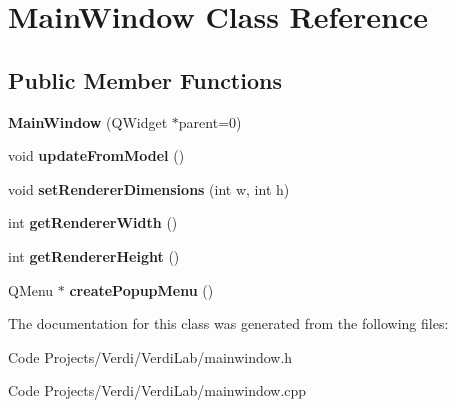\hypertarget{class_main_window}{\section{\-Main\-Window \-Class \-Reference}
\label{class_main_window}
}
\subsection*{\-Public \-Member \-Functions}
\begin{DoxyCompactItemize}
\item 
\hypertarget{class_main_window_a8b244be8b7b7db1b08de2a2acb9409db}{{\bfseries \-Main\-Window} (\-Q\-Widget $\ast$parent=0)}\label{class_main_window_a8b244be8b7b7db1b08de2a2acb9409db}

\item 
\hypertarget{class_main_window_a7346eb0e62874ffeaa4341ecbd9d5848}{void {\bfseries update\-From\-Model} ()}\label{class_main_window_a7346eb0e62874ffeaa4341ecbd9d5848}

\item 
\hypertarget{class_main_window_a65988194274e283254cd2b1be2e37898}{void {\bfseries set\-Renderer\-Dimensions} (int w, int h)}\label{class_main_window_a65988194274e283254cd2b1be2e37898}

\item 
\hypertarget{class_main_window_a7827efbb97ff11945bb13261fa7c5943}{int {\bfseries get\-Renderer\-Width} ()}\label{class_main_window_a7827efbb97ff11945bb13261fa7c5943}

\item 
\hypertarget{class_main_window_a8906c7cabf1635a584506097febae7a4}{int {\bfseries get\-Renderer\-Height} ()}\label{class_main_window_a8906c7cabf1635a584506097febae7a4}

\item 
\hypertarget{class_main_window_a2b95e9b04815277f93fea227e780a217}{\-Q\-Menu $\ast$ {\bfseries create\-Popup\-Menu} ()}\label{class_main_window_a2b95e9b04815277f93fea227e780a217}

\end{DoxyCompactItemize}


\-The documentation for this class was generated from the following files\-:\begin{DoxyCompactItemize}
\item 
\-Code Projects/\-Verdi/\-Verdi\-Lab/mainwindow.\-h\item 
\-Code Projects/\-Verdi/\-Verdi\-Lab/mainwindow.\-cpp\end{DoxyCompactItemize}
